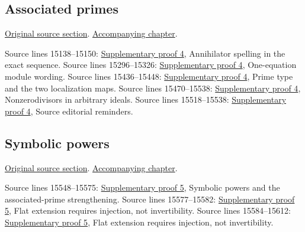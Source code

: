 \subsection{Associated primes}
\hypertarget{algebra-source-section-ass}{}
\noindent\href{https://github.com/stacks/stacks-project/blob/a04446e57ec1fbc252a871afcec7752fb2807b14/algebra.tex\#L15099}{Original source section}. \href{algebra.pdf\#nameddest=section-ass}{Accompanying chapter}.

\begin{AlgebraSourceRoutes}
 Source lines 15138--15150: \hyperlink{algebra_dimension_support_associated_notes_20260927}{Supplementary proof 4}, Annihilator spelling in the exact sequence.
 Source lines 15296--15326: \hyperlink{algebra_dimension_support_associated_notes_20260927}{Supplementary proof 4}, One-equation module wording.
 Source lines 15436--15448: \hyperlink{algebra_dimension_support_associated_notes_20260927}{Supplementary proof 4}, Prime type and the two localization maps.
 Source lines 15470--15538: \hyperlink{algebra_dimension_support_associated_notes_20260927}{Supplementary proof 4}, Nonzerodivisors in arbitrary ideals.
 Source lines 15518--15538: \hyperlink{algebra_dimension_support_associated_notes_20260927}{Supplementary proof 4}, Source editorial reminders.
\end{AlgebraSourceRoutes}

\subsection{Symbolic powers}
\hypertarget{algebra-source-section-symbolic-power}{}
\noindent\href{https://github.com/stacks/stacks-project/blob/a04446e57ec1fbc252a871afcec7752fb2807b14/algebra.tex\#L15542}{Original source section}. \href{algebra.pdf\#nameddest=section-symbolic-power}{Accompanying chapter}.

\begin{AlgebraSourceRoutes}
 Source lines 15548--15575: \hyperlink{algebra_symbolic_weakass_notes_20260927}{Supplementary proof 5}, Symbolic powers and the associated-prime strengthening.
 Source lines 15577--15582: \hyperlink{algebra_symbolic_weakass_notes_20260927}{Supplementary proof 5}, Flat extension requires injection, not invertibility.
 Source lines 15584--15612: \hyperlink{algebra_symbolic_weakass_notes_20260927}{Supplementary proof 5}, Flat extension requires injection, not invertibility.
\end{AlgebraSourceRoutes}

